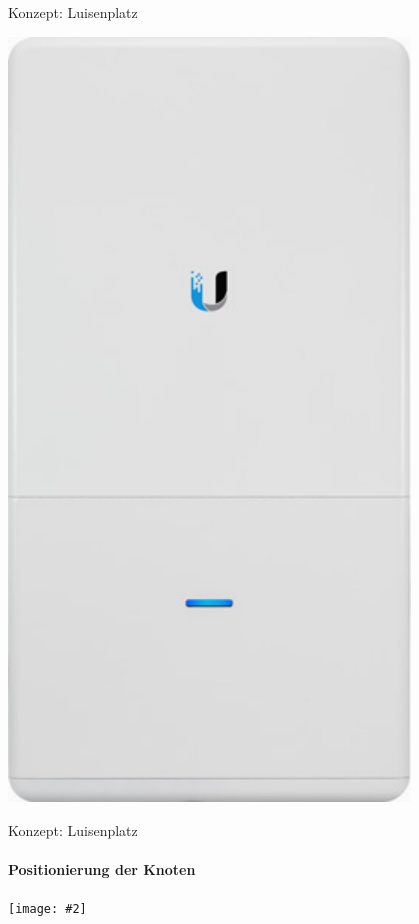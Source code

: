 \documentclass[]{beamer}
\newcommand{\centeredimage}[2][ ]{
        \begin{center}
            \texttt{[image: \#2]} $\;$

            \tiny{#1}
        \end{center}
}
\begin{document}
\begin{frame}{Konzept: Luisenplatz}
\begin{minipage}{0.4\textwidth}
\includegraphics[width=0.8\textwidth]{images/unifi-ap-ac-outdoor.jpg}
\end{minipage}



\end{frame}
\begin{frame}{Konzept: Luisenplatz}
\framesubtitle{Positionierung der Knoten}

\centeredimage{images/plan_luisenplatz2.jpg}
\end{frame}

\end{document}
